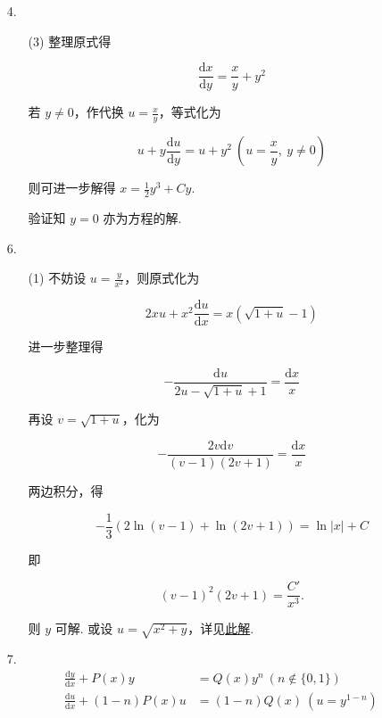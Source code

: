 \documentclass[oneside]{ctexbook} %
\begin{document}
\begin{enumerate}
    \item[4.]
    \begin{enumerate}
        \item[(3)]
        整理原式得
        
        $$
        \frac{\mathrm dx}{\mathrm dy} = \frac x y + y^2
        $$
        
        若 $y \neq 0$，作代换 $u = \frac x y$，等式化为
        
        $$
        u + y \frac{\mathrm du}{\mathrm dy} = u + y^2 \ \left( u = \frac x y,\ y \neq 0 \right)
        $$
        
        则可进一步解得 $x = \frac 1 2 y^3 + Cy$.
        
        验证知 $y = 0$ 亦为方程的解.
    \end{enumerate}
    \item[6.]
    \begin{enumerate}
        \item[(1)]
        不妨设 $u = \frac y {x^2}$，则原式化为
        
        $$
        2xu + x^2 \frac{\mathrm du}{\mathrm dx} = x \left( \sqrt{1+u} - 1 \right)
        $$
        
        进一步整理得
        
        $$
        - \frac{\mathrm du}{2u - \sqrt{1+u} + 1} = \frac {\mathrm dx} x
        $$
        
        再设 $v = \sqrt{1+u}$，化为
        
        $$
        - \frac{2v \mathrm dv}{(v-1)(2v+1)} = \frac {\mathrm dx} x
        $$
        
        两边积分，得
        
        $$
        -\frac 1 3 \left( 2 \ln(v-1) + \ln(2v+1) \right) = \ln|x| + C
        $$
        
        即
        
        $$
        (v-1)^2(2v+1) = \frac{C'}{x^3}.
        $$
        
        则 $y$ 可解. 或设 $u = \sqrt{x^2 + y}$，详见\href{https://math.stackexchange.com/questions/3374263/how-to-solve-the-following-ordinary-differential-equation}{此解}.
    \end{enumerate}
    \item[7.]
    $$
    \begin{aligned}
        \frac{\mathrm dy}{\mathrm dx} + P(x) y &= Q(x) y^n \ (n \not\in \{ 0, 1 \} ) \\
        \frac{\mathrm du}{\mathrm dx} + (1-n) P(x) u &= (1-n) Q(x) \ (u = y^{1-n}) \\
    \end{aligned}
    $$
    

\end{enumerate}
\end{document}

